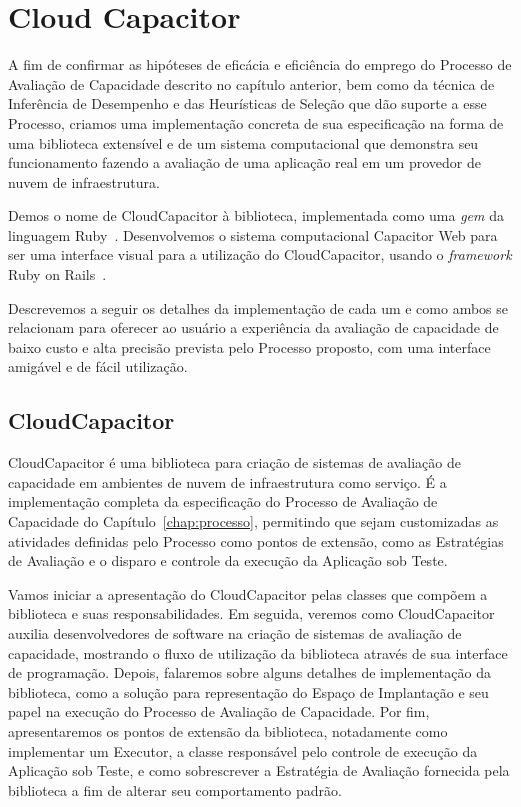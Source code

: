 \chapter{Cloud Capacitor}
\label{chap:capacitor}
A fim de confirmar as hipóteses de eficácia e eficiência do emprego do Processo
de Avaliação de Capacidade descrito no capítulo anterior, bem como da técnica de
Inferência de Desempenho e das Heurísticas de Seleção que dão suporte a esse Processo, 
criamos uma implementação concreta de sua especificação na forma de uma biblioteca
extensível e de um sistema computacional que demonstra seu funcionamento fazendo
a avaliação de uma aplicação real em um provedor de nuvem de infraestrutura.

Demos o nome de CloudCapacitor à biblioteca, implementada como uma \emph{gem} da
linguagem Ruby~\cite{ruby}. Desenvolvemos o sistema computacional Capacitor Web 
para ser uma interface visual para a utilização do CloudCapacitor, usando 
o \emph{framework} Ruby on Rails~\cite{rails}.  

Descrevemos a seguir os detalhes da implementação de cada um e como ambos se
relacionam para oferecer ao usuário a experiência da avaliação de capacidade
de baixo custo e alta precisão prevista pelo Processo proposto, com uma interface
amigável e de fácil utilização.

\section{CloudCapacitor}
CloudCapacitor é uma biblioteca para criação de sistemas de avaliação de 
capacidade em ambientes de nuvem de infraestrutura como serviço. É a implementação
completa da especificação do Processo de Avaliação de Capacidade do 
Capítulo~\ref{chap:processo}, permitindo que sejam customizadas as atividades 
definidas pelo Processo como pontos de extensão, como as Estratégias de Avaliação
e o disparo e controle da execução da Aplicação sob Teste.

Vamos iniciar a apresentação do CloudCapacitor pelas classes que compõem a biblioteca
e suas responsabilidades. Em seguida, veremos como CloudCapacitor auxilia 
desenvolvedores de software na criação de sistemas de avaliação de capacidade,
mostrando o fluxo de utilização da biblioteca através de sua interface de programação.
Depois, falaremos sobre alguns detalhes de implementação da biblioteca, como 
a solução para representação do Espaço de Implantação e seu papel na execução do
Processo de Avaliação de Capacidade. Por fim, apresentaremos os pontos de extensão
da biblioteca, notadamente como implementar um Executor, a classe responsável pelo
controle de execução da Aplicação sob Teste, e como sobrescrever a Estratégia de
Avaliação fornecida pela biblioteca a fim de alterar seu comportamento padrão.

